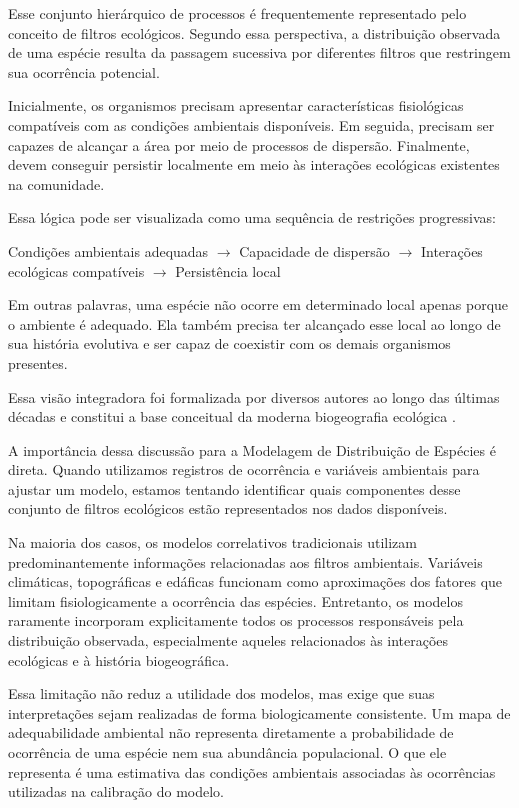 Esse conjunto hierárquico de processos é frequentemente representado pelo conceito de filtros ecológicos. Segundo essa perspectiva, a distribuição observada de uma espécie resulta da passagem sucessiva por diferentes filtros que restringem sua ocorrência potencial.

Inicialmente, os organismos precisam apresentar características fisiológicas compatíveis com as condições ambientais disponíveis. Em seguida, precisam ser capazes de alcançar a área por meio de processos de dispersão. Finalmente, devem conseguir persistir localmente em meio às interações ecológicas existentes na comunidade.

Essa lógica pode ser visualizada como uma sequência de restrições progressivas:

\begin{center}
	Condições ambientais adequadas
	$\rightarrow$
	Capacidade de dispersão
	$\rightarrow$
	Interações ecológicas compatíveis
	$\rightarrow$
	Persistência local
\end{center}

Em outras palavras, uma espécie não ocorre em determinado local apenas porque o ambiente é adequado. Ela também precisa ter alcançado esse local ao longo de sua história evolutiva e ser capaz de coexistir com os demais organismos presentes.

Essa visão integradora foi formalizada por diversos autores ao longo das últimas décadas e constitui a base conceitual da moderna biogeografia ecológica \parencite{soberon2005,soberon2007,soberon2009,barve2011crucial}.

A importância dessa discussão para a Modelagem de Distribuição de Espécies é direta. Quando utilizamos registros de ocorrência e variáveis ambientais para ajustar um modelo, estamos tentando identificar quais componentes desse conjunto de filtros ecológicos estão representados nos dados disponíveis.

Na maioria dos casos, os modelos correlativos tradicionais utilizam predominantemente informações relacionadas aos filtros ambientais. Variáveis climáticas, topográficas e edáficas funcionam como aproximações dos fatores que limitam fisiologicamente a ocorrência das espécies. Entretanto, os modelos raramente incorporam explicitamente todos os processos responsáveis pela distribuição observada, especialmente aqueles relacionados às interações ecológicas e à história biogeográfica.

Essa limitação não reduz a utilidade dos modelos, mas exige que suas interpretações sejam realizadas de forma biologicamente consistente. Um mapa de adequabilidade ambiental não representa diretamente a probabilidade de ocorrência de uma espécie nem sua abundância populacional. O que ele representa é uma estimativa das condições ambientais associadas às ocorrências utilizadas na calibração do modelo.

